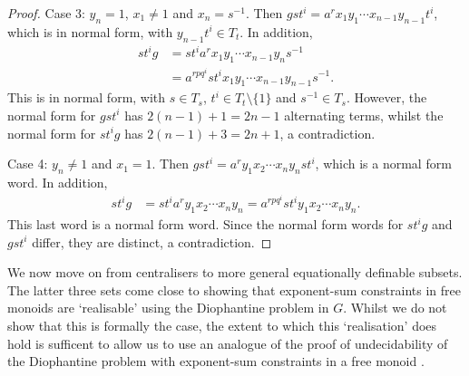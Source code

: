 \documentclass[11pt]{amsart}
\theoremstyle{definition}
\numberwithin{theorem}{section}
\begin{document}
\begin{proof}
		Case 3: \(y_n = 1\), \(x_1 \neq 1\) and \(x_n = s^{-1}\).
		Then \(gst^i = a^r x_1 y_1 \cdots x_{n - 1} y_{n - 1} t^i\),
		which is in normal form, with \(y_{n - 1} t^i \in T_t\). In
		addition,
		\begin{align*}
				st^i g & = st^i a^r x_1 y_1 \cdots x_{n - 1} y_n s^{-1} \\
					   & = a^{rpq^i} st^i x_1 y_1 \cdots x_{n - 1} y_{n -1} s^{-1}.
		\end{align*}
		This is in normal form, with \(s \in T_s\), \(t^i \in T_t \setminus
		\{1\}\) and \(s^{-1} \in T_s\). However, the normal form for \(gst^i\)
		has \(2(n - 1) +1 = 2n - 1\) alternating terms, whilst the normal form
		for \(st^i g\) has \(2(n - 1) + 3 = 2n + 1\), a contradiction.

		Case 4: \(y_n \neq 1\) and \(x_1 = 1\). Then \(g st^i
		= a^r y_1 x_2 \cdots x_n y_n st^i\), which is a normal form word.
		In addition,
		\begin{align*}
			st^i g & = st^i a^r y_1 x_2 \cdots x_n y_n
				    = a^{rpq^i} st^i y_1 x_2 \cdots x_n y_n.
		\end{align*}
		This last word is a normal form word. Since the normal form words
		for \(st^i g\) and \(g st^i\) differ, they are distinct, a contradiction.
	\end{proof}

	We now move on from centralisers to more general equationally definable
	subsets. The latter three sets come
	close to showing that exponent-sum constraints in free monoids are
	`realisable' using the Diophantine problem in \(G\). Whilst we do not
	show that this is formally the case, the extent to which this
	`realisation' does hold is sufficent to allow us to use an analogue of
	the proof of undecidability of the Diophantine problem with exponent-sum
	constraints in a free monoid \cite{BuchiSenger}.
\end{document}
